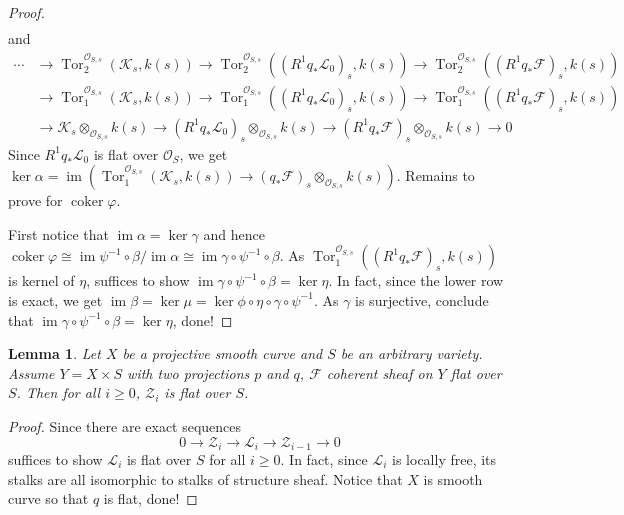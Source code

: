 \documentclass{ctexart}
\newtheorem{lemma}{Lemma}[section]
\newcommand{\im}{\operatorname{im}}
\newcommand{\tor}{\operatorname{Tor}}
\newcommand{\coker}{\operatorname{coker}}
\begin{document}
\begin{proof}
\begin{equation}
\begin{split}
        \end{split}
    \end{equation}
    and
    \begin{equation}
        \begin{split}
            \cdots & \rightarrow \tor_{2}^{\mathcal{O}_{S, s}}(\mathcal{K}_{s}, k(s)) \rightarrow \tor_{2}^{\mathcal{O}_{S, s}}((R^{1}q_{\ast}\mathcal{L}_{0})_{s}, k(s)) \rightarrow \tor_{2}^{\mathcal{O}_{S, s}}((R^{1}q_{\ast}\mathcal{F})_{s}, k(s)) \\
            & \rightarrow \tor_{1}^{\mathcal{O}_{S, s}}(\mathcal{K}_{s}, k(s)) \rightarrow \tor_{1}^{\mathcal{O}_{S, s}}((R^{1}q_{\ast}\mathcal{L}_{0})_{s}, k(s)) \rightarrow \tor_{1}^{\mathcal{O}_{S, s}}((R^{1}q_{\ast}\mathcal{F})_{s}, k(s)) \\
            & \rightarrow \mathcal{K}_{s} \otimes_{\mathcal{O}_{S, s}} k(s) \rightarrow (R^{1}q_{\ast}\mathcal{L}_{0})_{s} \otimes_{\mathcal{O}_{S, s}} k(s) \rightarrow (R^{1}q_{\ast}\mathcal{F})_{s} \otimes_{\mathcal{O}_{S, s}} k(s) \rightarrow 0
        \end{split}
    \end{equation}
    Since $R^{1}q_{\ast}\mathcal{L}_{0}$ is flat over $\mathcal{O}_{S}$,
    we get $\ker \alpha = \im (\tor_{1}^{\mathcal{O}_{S, s}}(\mathcal{K}_{s}, k(s)) \rightarrow (q_{\ast}\mathcal{F})_{s} \otimes_{\mathcal{O}_{S, s}} k(s))$.
    Remains to prove for $\coker \varphi$.
    \par
    First notice that $\im \alpha = \ker \gamma$ and hence $\coker \varphi \cong \im \psi^{-1} \circ \beta/\im \alpha \cong \im \gamma \circ \psi^{-1} \circ \beta$.
    As $\tor_{1}^{\mathcal{O}_{S, s}}((R^{1}q_{\ast}\mathcal{F})_{s}, k(s))$ is kernel of $\eta$,
    suffices to show $\im \gamma \circ \psi^{-1} \circ \beta = \ker \eta$.
    In fact, since the lower row is exact, we get $\im \beta = \ker \mu = \ker \phi \circ \eta \circ \gamma \circ \psi^{-1}$.
    As $\gamma$ is surjective, conclude that $\im \gamma \circ \psi^{-1} \circ \beta = \ker \eta$, done!
\end{proof}
\begin{lemma}
    Let $X$ be a projective smooth curve and $S$ be an arbitrary variety.
    Assume $Y = X \times S$ with two projections $p$ and $q$, $\mathcal{F}$ coherent sheaf on $Y$ flat over $S$.
    Then for all $i \ge 0$, $\mathcal{Z}_{i}$ is flat over $S$.
    \label{Lemma 7.6}
\end{lemma}
\begin{proof}
    Since there are exact sequences
    \begin{equation}
        0 \longrightarrow \mathcal{Z}_{i} \longrightarrow \mathcal{L}_{i} \longrightarrow \mathcal{Z}_{i - 1} \longrightarrow 0
    \end{equation}
    suffices to show $\mathcal{L}_{i}$ is flat over $S$ for all $i \ge 0$.
    In fact, since $\mathcal{L}_{i}$ is locally free, its stalks are all isomorphic to stalks of structure sheaf.
    Notice that $X$ is smooth curve so that $q$ is flat, done!
\end{proof}
\end{document}
